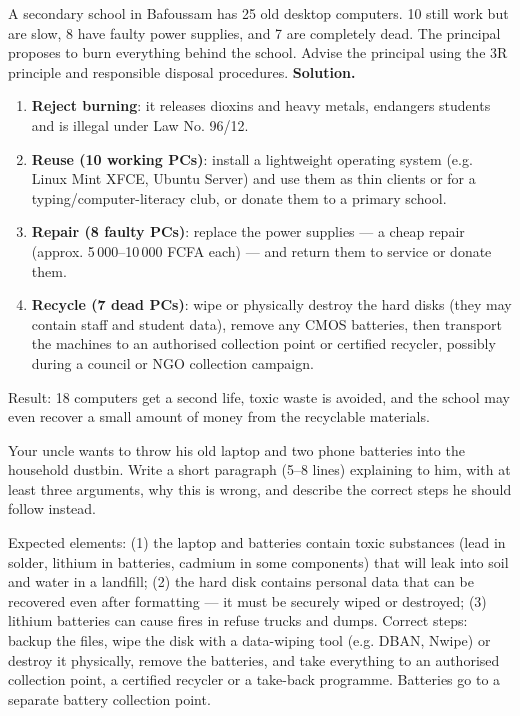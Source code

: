 \documentclass[11pt]{article}
\begin{document}
\begin{exoresolu}
A secondary school in Bafoussam has 25 old desktop computers. 10 still work but are slow, 8 have faulty power supplies, and 7 are completely dead. The principal proposes to burn everything behind the school. Advise the principal using the 3R principle and responsible disposal procedures.
\tcblower
\textbf{Solution.}
\begin{enumerate}
\item \textbf{Reject burning}: it releases dioxins and heavy metals, endangers students and is illegal under Law No. 96/12.
\item \textbf{Reuse (10 working PCs)}: install a lightweight operating system (e.g. Linux Mint XFCE, Ubuntu Server) and use them as thin clients or for a typing/computer-literacy club, or donate them to a primary school.
\item \textbf{Repair (8 faulty PCs)}: replace the power supplies --- a cheap repair (approx. 5\,000--10\,000 FCFA each) --- and return them to service or donate them.
\item \textbf{Recycle (7 dead PCs)}: wipe or physically destroy the hard disks (they may contain staff and student data), remove any CMOS batteries, then transport the machines to an authorised collection point or certified recycler, possibly during a council or NGO collection campaign.
\end{enumerate}
Result: 18 computers get a second life, toxic waste is avoided, and the school may even recover a small amount of money from the recyclable materials.
\end{exoresolu}

\begin{exercice}
Your uncle wants to throw his old laptop and two phone batteries into the household dustbin. Write a short paragraph (5--8 lines) explaining to him, with at least three arguments, why this is wrong, and describe the correct steps he should follow instead.
\end{exercice}

\begin{corrige}[Exercise 1]
Expected elements: (1) the laptop and batteries contain toxic substances (lead in solder, lithium in batteries, cadmium in some components) that will leak into soil and water in a landfill; (2) the hard disk contains personal data that can be recovered even after formatting --- it must be securely wiped or destroyed; (3) lithium batteries can cause fires in refuse trucks and dumps. Correct steps: backup the files, wipe the disk with a data-wiping tool (e.g. DBAN, Nwipe) or destroy it physically, remove the batteries, and take everything to an authorised collection point, a certified recycler or a take-back programme. Batteries go to a separate battery collection point.
\end{corrige}
\end{document}
